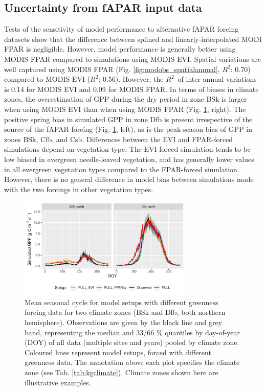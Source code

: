 \documentclass[gmd, manuscript]{copernicus}
\newcommand{\rsq}{$R^2$}
\begin{document}
\subsection{Uncertainty from fAPAR input data}
\label{sec:results_greenness}

Tests of the sensitivity of model performance to alternative fAPAR forcing datasets show that the difference between splined and linearly-interpolated MODI FPAR is negligible. However, model performance is generally better using MODIS FPAR compared to simulations using MODIS EVI. Spatial variations are well captured using MODIS FPAR (Fig. \ref{fig:modobs_spatialannual}, \rsq : 0.70) compared to MODIS EVI (\rsq : 0.56). However, the \rsq\ of inter-annual variations is 0.14 for MODIS EVI and 0.09 for MODIS FPAR. In terms of biases in climate zones, the overestimation of GPP during the dry period in zone BSk is larger when using MODIS EVI than when using MODIS FPAR (Fig. \ref{fig:season_greenness}, right). The positive spring bias in simulated GPP in zone Dfb is present irrespective of the source of the fAPAR forcing (Fig. \ref{fig:season_greenness}, left), as is the peak-season bias of GPP in zones BSk, Cfb, and Csb. Differences between the EVI and FPAR-forced simulations depend on vegetation type. The EVI-forced simulation tends to be low biased in evergreen needle-leaved vegetation, and has generally lower values in all evergreen vegetation types compared to the FPAR-forced simulation. However, there is no general difference in model bias between simulations made with the two forcings in other vegetation types. 

 \begin{figure}[t]
\includegraphics[width=8.3cm]{fig/meandoy_byzone_greenness.pdf}
    \caption{Mean seasonal cycle for model setups with different greenness forcing data for two climate zones (BSk and Dfb, both northern hemisphere). Observations are given by the black line and grey band, representing the median and 33/66 \% quantiles by day-of-year (DOY) of all data (multiple sites and years) pooled by climate zone. Coloured lines represent model setups, forced with different greenness data. The annotation above each plot specifies the climate zone (see Tab. \ref{tab:kgclimate}). Climate zones shown here are illustrative examples.}
    \label{fig:season_greenness}
\end{figure}
\end{document}
